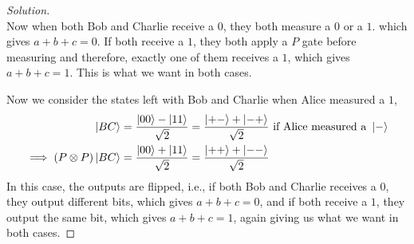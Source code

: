 \begin{solution}[label=ques:3c]
\begin{proof}[Solution]
\begin{equation}
      \label{eq:ghz2}
    \end{equation}
    Now when both Bob and Charlie receive a $0$, they both measure a $0$ or a $1$. which gives $a + b + c = 0$. If both receive a $1$, they both apply a $P$ gate before measuring and therefore, exactly one of them receives a $1$, which gives $a + b + c = 1$. This is what we want in both cases.\par
    Now we consider the states left with Bob and Charlie when Alice measured a $1$,
    \begin{equation}
      \begin{split}
        \ket{BC} &= \frac{\ket{00} - \ket{11}}{\sqrt{2}} = \frac{\ket{+-} + \ket{-+}}{\sqrt{2}}\text{ if Alice measured a }\ket{-}\\
        \implies (P \otimes P)\ket{BC} &= \frac{\ket{00} + \ket{11}}{\sqrt{2}} = \frac{\ket{++} + \ket{--}}{\sqrt{2}}
      \end{split}
      \label{eq:ghz3}
    \end{equation}
    In this case, the outputs are flipped, i.e., if both Bob and Charlie receives a $0$, they output different bits, which gives $a + b + c = 0$, and if both receive a $1$, they output the same bit, which gives $a + b + c = 1$, again giving us what we want in both cases.
  \end{proof}
\end{solution}
